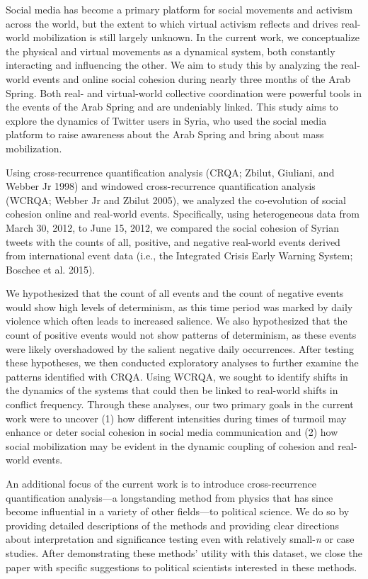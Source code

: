 \documentclass[english,man]{apa6}
\begin{document}
Social media has become a primary platform for social movements and activism
across the world, but the extent to which virtual activism reflects and drives
real-world mobilization is still largely unknown. In the current work, we
conceptualize the physical and virtual movements as a dynamical system, both
constantly interacting and influencing the other. We aim to study this by
analyzing the real-world events and online social cohesion during nearly three
months of the Arab Spring. Both real- and virtual-world collective coordination
were powerful tools in the events of the Arab Spring and are undeniably linked.
This study aims to explore the dynamics of Twitter users in Syria, who used the
social media platform to raise awareness about the Arab Spring and bring about
mass mobilization.

Using cross-recurrence quantification analysis (CRQA; Zbilut, Giuliani, and Webber Jr 1998) and
windowed cross-recurrence quantification analysis (WCRQA; Webber Jr and Zbilut 2005), we analyzed the co-evolution of social cohesion online
and real-world events. Specifically, using heterogeneous data from March 30,
2012, to June 15, 2012, we compared the social cohesion of Syrian tweets with
the counts of all, positive, and negative real-world events derived from
international event data (i.e., the Integrated Crisis Early Warning System; Boschee et al. 2015).

We hypothesized that the count of all events and the count of negative events
would show high levels of determinism, as this time period was marked by daily
violence which often leads to increased salience. We also hypothesized that the
count of positive events would not show patterns of determinism, as these events
were likely overshadowed by the salient negative daily occurrences. After
testing these hypotheses, we then conducted exploratory analyses to further
examine the patterns identified with CRQA. Using WCRQA, we sought to identify
shifts in the dynamics of the systems that could then be linked to real-world
shifts in conflict frequency. Through these analyses, our two primary goals in
the current work were to uncover (1) how different intensities during times of
turmoil may enhance or deter social cohesion in social media communication and
(2) how social mobilization may be evident in the dynamic coupling of cohesion
and real-world events.

An additional focus of the current work is to introduce cross-recurrence
quantification analysis---a longstanding method from physics that has since
become influential in a variety of other fields---to political science. We do so
by providing detailed descriptions of the methods and providing clear directions
about interpretation and significance testing even with relatively small-\emph{n} or
case studies. After demonstrating these methods' utility with this dataset, we
close the paper with specific suggestions to political scientists interested in
these methods.
\end{document}
